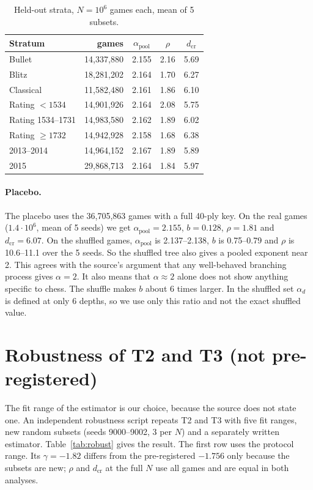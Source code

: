 \documentclass[11pt]{article}
\begin{document}
\begin{table}[t]
\centering
\begin{tabular}{lrccc}
\toprule
Stratum & games & $\alpha_{\mathrm{pool}}$ & $\rho$ & $d_{\mathrm{cr}}$\\
\midrule
Bullet & 14,337,880 & 2.155 & 2.16 & 5.69\\
Blitz & 18,281,202 & 2.164 & 1.70 & 6.27\\
Classical & 11,582,480 & 2.161 & 1.86 & 6.10\\
Rating $<1534$ & 14,901,926 & 2.164 & 2.08 & 5.75\\
Rating 1534--1731 & 14,983,580 & 2.162 & 1.89 & 6.02\\
Rating $\ge1732$ & 14,942,928 & 2.158 & 1.68 & 6.38\\
2013--2014 & 14,964,152 & 2.167 & 1.89 & 5.89\\
2015 & 29,868,713 & 2.164 & 1.84 & 5.97\\
\bottomrule
\end{tabular}
\caption{Held-out strata, $N=10^6$ games each, mean of 5 subsets.}
\label{tab:strata}
\end{table}

\paragraph{Placebo.} The placebo uses the 36,705,863 games with a full 40-ply key. On the real games ($1.4\cdot10^6$, mean of 5 seeds) we get $\alpha_{\mathrm{pool}}=2.155$, $b=0.128$, $\rho=1.81$ and $d_{\mathrm{cr}}=6.07$. On the shuffled games, $\alpha_{\mathrm{pool}}$ is 2.137--2.138, $b$ is 0.75--0.79 and $\rho$ is 10.6--11.1 over the 5 seeds. So the shuffled tree also gives a pooled exponent near 2. This agrees with the source's argument that any well-behaved branching process gives $\alpha=2$. It also means that $\alpha\approx2$ alone does not show anything specific to chess. The shuffle makes $b$ about 6 times larger. In the shuffled set $\alpha_d$ is defined at only 6 depths, so we use only this ratio and not the exact shuffled value.

\section{Robustness of T2 and T3 (not pre-registered)}\label{sec:robust}
The fit range of the estimator is our choice, because the source does not state one. An independent robustness script repeats T2 and T3 with five fit ranges, new random subsets (seeds 9000--9002, 3 per $N$) and a separately written estimator. Table~\ref{tab:robust} gives the result. The first row uses the protocol range. Its $\gamma=-1.82$ differs from the pre-registered $-1.756$ only because the subsets are new; $\rho$ and $d_{\mathrm{cr}}$ at the full $N$ use all games and are equal in both analyses.
\end{document}
